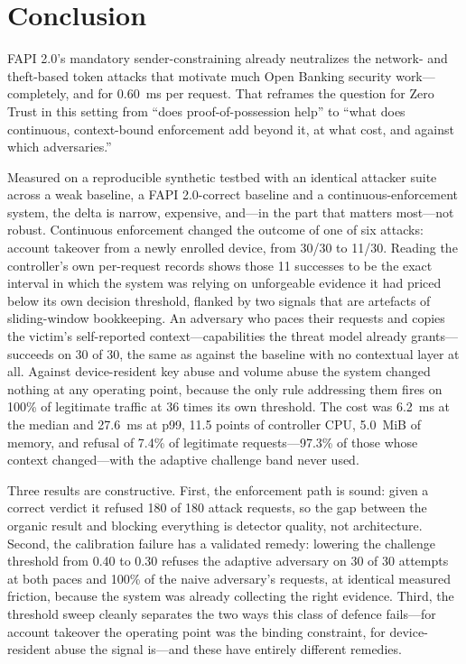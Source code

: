 \section{Conclusion}
\label{sec:conclusion}

FAPI 2.0's mandatory sender-constraining already neutralizes the network- and theft-based token attacks that motivate much Open Banking security work---completely, and for 0.60~ms per request. That reframes the question for Zero Trust in this setting from ``does proof-of-possession help'' to ``what does continuous, context-bound enforcement add beyond it, at what cost, and against which adversaries.''

Measured on a reproducible synthetic testbed with an identical attacker suite across a weak baseline, a FAPI 2.0-correct baseline and a continuous-enforcement system, the delta is narrow, expensive, and---in the part that matters most---not robust. Continuous enforcement changed the outcome of one of six attacks: account takeover from a newly enrolled device, from 30/30 to 11/30. Reading the controller's own per-request records shows those 11 successes to be the exact interval in which the system was relying on unforgeable evidence it had priced below its own decision threshold, flanked by two signals that are artefacts of sliding-window bookkeeping. An adversary who paces their requests and copies the victim's self-reported context---capabilities the threat model already grants---succeeds on 30 of 30, the same as against the baseline with no contextual layer at all. Against device-resident key abuse and volume abuse the system changed nothing at any operating point, because the only rule addressing them fires on 100\% of legitimate traffic at 36 times its own threshold. The cost was 6.2~ms at the median and 27.6~ms at p99, 11.5 points of controller CPU, 5.0~MiB of memory, and refusal of 7.4\% of legitimate requests---97.3\% of those whose context changed---with the adaptive challenge band never used.

Three results are constructive. First, the enforcement path is sound: given a correct verdict it refused 180 of 180 attack requests, so the gap between the organic result and blocking everything is detector quality, not architecture. Second, the calibration failure has a validated remedy: lowering the challenge threshold from 0.40 to 0.30 refuses the adaptive adversary on 30 of 30 attempts at both paces and 100\% of the naive adversary's requests, at identical measured friction, because the system was already collecting the right evidence. Third, the threshold sweep cleanly separates the two ways this class of defence fails---for account takeover the operating point was the binding constraint, for device-resident abuse the signal is---and these have entirely different remedies.

